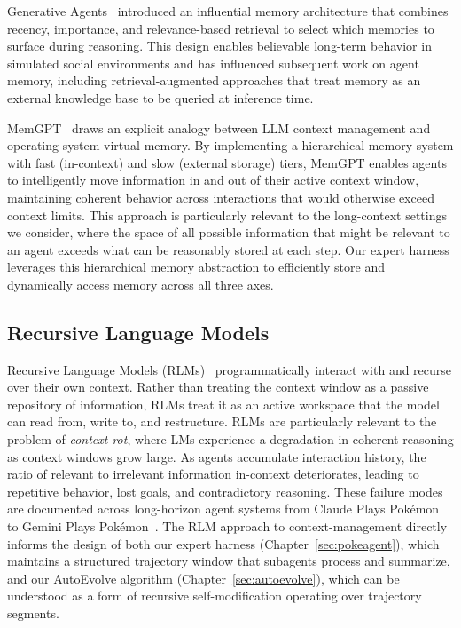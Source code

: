 Generative Agents~\citep{park2023generative} introduced an influential memory architecture that combines recency, importance, and relevance-based retrieval to select which memories to surface during reasoning. This design enables believable long-term behavior in simulated social environments and has influenced subsequent work on agent memory, including retrieval-augmented approaches that treat memory as an external knowledge base to be queried at inference time.

MemGPT~\citep{packer2023memgpt} draws an explicit analogy between LLM context management and operating-system virtual memory. By implementing a hierarchical memory system with fast (in-context) and slow (external storage) tiers, MemGPT enables agents to intelligently move information in and out of their active context window, maintaining coherent behavior across interactions that would otherwise exceed context limits. This approach is particularly relevant to the long-context settings we consider, where the space of all possible information that might be relevant to an agent exceeds what can be reasonably stored at each step. Our expert harness leverages this hierarchical memory abstraction to efficiently store and dynamically access memory across all three axes.

\subsection{Recursive Language Models}\label{sec:rlm}

Recursive Language Models (RLMs)~\citep{zhang2025rlm} programmatically interact with and recurse over their own context. Rather than treating the context window as a passive repository of information, RLMs treat it as an active workspace that the model can read from, write to, and restructure. RLMs are particularly relevant to the problem of \emph{context rot}, where LMs experience a degradation in coherent reasoning as context windows grow large. As agents accumulate interaction history, the ratio of relevant to irrelevant information in-context deteriorates, leading to repetitive behavior, lost goals, and contradictory reasoning. These failure modes are documented across long-horizon agent systems from Claude Plays Pok\'{e}mon~\citep{anthropic2025visible} to Gemini Plays Pok\'{e}mon~\citep{zhang2025geminiplayspokemon}. The RLM approach to context-management directly informs the design of both our expert harness (Chapter~\ref{sec:pokeagent}), which maintains a structured trajectory window that subagents process and summarize, and our AutoEvolve algorithm (Chapter~\ref{sec:autoevolve}), which can be understood as a form of recursive self-modification operating over trajectory segments.

